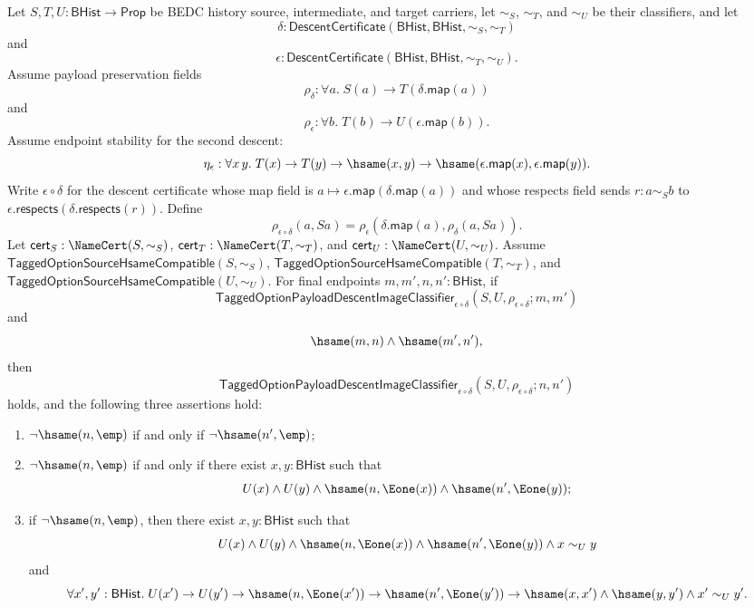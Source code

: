 \begin{theorem}
Let $S,T,U:\mathsf{BHist}\to\mathsf{Prop}$ be BEDC history source,
intermediate, and target carriers, let $\sim_S$, $\sim_T$, and $\sim_U$ be their
classifiers, and let
$$
\delta:\mathsf{DescentCertificate}(\mathsf{BHist},\mathsf{BHist},\sim_S,\sim_T)
$$
and
$$
\epsilon:\mathsf{DescentCertificate}(\mathsf{BHist},\mathsf{BHist},\sim_T,\sim_U).
$$
Assume payload preservation fields
$$
\rho_{\delta}:\forall a.\;S(a)\to T(\delta.\mathsf{map}(a))
$$
and
$$
\rho_{\epsilon}:\forall b.\;T(b)\to U(\epsilon.\mathsf{map}(b)).
$$
Assume endpoint stability for the second descent:
$$
\eta_{\epsilon}:\forall x\,y.\;
T(x)\to T(y)\to \hsame(x,y)\to
\hsame(\epsilon.\mathsf{map}(x),\epsilon.\mathsf{map}(y)).
$$
Write $\epsilon\circ\delta$ for the descent certificate whose map field is
$a\mapsto\epsilon.\mathsf{map}(\delta.\mathsf{map}(a))$ and whose respects field
sends $r:a\sim_S b$ to
$\epsilon.\mathsf{respects}(\delta.\mathsf{respects}(r))$. Define
$$
\rho_{\epsilon\circ\delta}(a,Sa)=
\rho_{\epsilon}(\delta.\mathsf{map}(a),\rho_{\delta}(a,Sa)).
$$
Let $\mathsf{cert}_S:\NameCert(S,\sim_S)$,
$\mathsf{cert}_T:\NameCert(T,\sim_T)$, and
$\mathsf{cert}_U:\NameCert(U,\sim_U)$. Assume
$\mathsf{TaggedOptionSourceHsameCompatible}(S,\sim_S)$,
$\mathsf{TaggedOptionSourceHsameCompatible}(T,\sim_T)$, and
$\mathsf{TaggedOptionSourceHsameCompatible}(U,\sim_U)$. For final endpoints
$m,m',n,n':\mathsf{BHist}$, if
$$
\mathsf{TaggedOptionPayloadDescentImageClassifier}_{\epsilon\circ\delta}
(S,U,\rho_{\epsilon\circ\delta};m,m')
$$
and
$$
\hsame(m,n)\land \hsame(m',n'),
$$
then
$$
\mathsf{TaggedOptionPayloadDescentImageClassifier}_{\epsilon\circ\delta}
(S,U,\rho_{\epsilon\circ\delta};n,n')
$$
holds, and the following three assertions hold:
\begin{enumerate}
\item $\neg\hsame(n,\emp)$ if and only if $\neg\hsame(n',\emp)$;
\item $\neg\hsame(n,\emp)$ if and only if there exist
$x,y:\mathsf{BHist}$ such that
$$
U(x)\land U(y)\land
\hsame(n,\Eone(x))\land
\hsame(n',\Eone(y));
$$
\item if $\neg\hsame(n,\emp)$, then there exist $x,y:\mathsf{BHist}$ such that
$$
U(x)\land U(y)\land
\hsame(n,\Eone(x))\land
\hsame(n',\Eone(y))\land
x\sim_U y
$$
and
$$
\forall x',y':\mathsf{BHist}.\;
U(x')\to U(y')\to
\hsame(n,\Eone(x'))\to
\hsame(n',\Eone(y'))\to
\hsame(x,x')\land \hsame(y,y')\land x'\sim_U y'.
$$
\end{enumerate}
\end{theorem}

